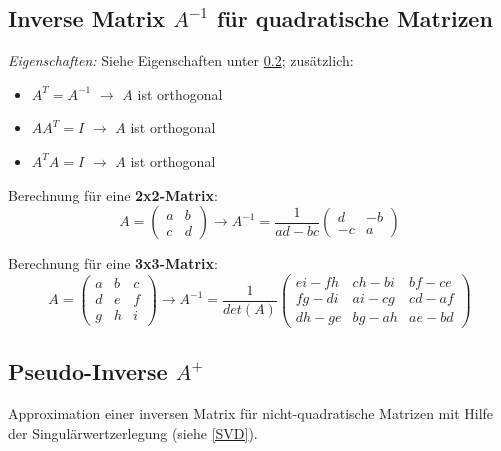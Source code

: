 \subsection{Inverse Matrix \(A^{-1}\) für quadratische Matrizen}

\textit{Eigenschaften:} Siehe Eigenschaften unter \ref{PseudoInverse}; zusätzlich:
\begin{itemize}
    \item \(A^T = A^{-1}\) \(\rightarrow\) \(A\) ist orthogonal
    \item \(A  A^T = I\) \(\rightarrow\) \(A\) ist orthogonal
    \item \(A^T  A = I\) \(\rightarrow\) \(A\) ist orthogonal\\
\end{itemize}

Berechnung für eine \textbf{2x2-Matrix}:
\begin{equation*}
    A = \begin{pmatrix}
        a & b\\
        c & d
    \end{pmatrix} \rightarrow A^{-1} = \frac{1}{ad-bc} \begin{pmatrix}
        d & -b\\
        -c & a
    \end{pmatrix}
\end{equation*}

Berechnung für eine \textbf{3x3-Matrix}:
\begin{equation*}
    A = \begin{pmatrix}
        a & b & c\\
        d & e & f\\
        g & h & i
    \end{pmatrix} \rightarrow A^{-1} = \frac{1}{det(A)} \begin{pmatrix}
        ei-fh & ch-bi & bf-ce\\
        fg-di & ai-cg & cd-af\\
        dh-ge & bg-ah & ae-bd
    \end{pmatrix}
\end{equation*}


\subsection{Pseudo-Inverse \(A^+\)}
\label{PseudoInverse}

Approximation einer inversen Matrix für nicht-quadratische Matrizen mit Hilfe der Singulärwertzerlegung (siehe \ref{SVD}).

